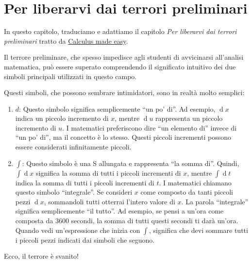 \documentclass[
  italian,
  letterpaper,
  a4paper,
  11pt,
  open=any]{scrbook}
\theoremstyle{plain}
\theoremstyle{definition}
\theoremstyle{definition}
\theoremstyle{remark}
\begin{document}
\chapter{Per liberarvi dai terrori preliminari}\label{sec-apx-calculus}

In questo capitolo, traduciamo e adattiamo il capitolo \emph{Per
liberarvi dai terrori preliminari} tratto da
\href{https://calculusmadeeasy.org/1.html}{Calculus made easy}.

\begin{tcolorbox}[enhanced jigsaw, arc=.35mm, bottomrule=.15mm, bottomtitle=1mm, breakable, colback=white, colbacktitle=quarto-callout-important-color!10!white, colframe=quarto-callout-important-color-frame, coltitle=black, left=2mm, leftrule=.75mm, opacityback=0, opacitybacktitle=0.6, rightrule=.15mm, title=\textcolor{quarto-callout-important-color}{\faExclamation}\hspace{0.5em}{Superare i terrori preliminari}, titlerule=0mm, toprule=.15mm, toptitle=1mm]

Il terrore preliminare, che spesso impedisce agli studenti di
avvicinarsi all'analisi matematica, può essere superato comprendendo il
significato intuitivo dei due simboli principali utilizzati in questo
campo.

Questi simboli, che possono sembrare intimidatori, sono in realtà molto
semplici:

\begin{enumerate}
\def\labelenumi{\arabic{enumi}.}
\item
  \textbf{\(d\)}: Questo simbolo significa semplicemente ``un po' di''.
  Ad esempio, \(\operatorname{d}\!x\) indica un piccolo incremento di
  \(x\), mentre \(\operatorname{d}\!u\) rappresenta un piccolo
  incremento di \(u\). I matematici preferiscono dire ``un elemento di''
  invece di ``un po' di'', ma il concetto è lo stesso. Questi piccoli
  incrementi possono essere considerati infinitamente piccoli.
\item
  \textbf{\(\int\)}: Questo simbolo è una S allungata e rappresenta ``la
  somma di''. Quindi, \(\int \operatorname{d}\!x\) significa la somma di
  tutti i piccoli incrementi di \(x\), mentre
  \(\int \operatorname{d}\!t\) indica la somma di tutti i piccoli
  incrementi di \(t\). I matematici chiamano questo simbolo
  ``integrale''. Se consideri \(x\) come composto da tanti piccoli pezzi
  \(\operatorname{d}\!x\), sommandoli tutti otterrai l'intero valore di
  \(x\). La parola ``integrale'' significa semplicemente ``il tutto''.
  Ad esempio, se pensi a un'ora come composta da 3600 secondi, la somma
  di tutti questi secondi ti darà un'ora. Quando vedi un'espressione che
  inizia con \(\int\), significa che devi sommare tutti i piccoli pezzi
  indicati dai simboli che seguono.
\end{enumerate}

Ecco, il terrore è svanito!

\end{tcolorbox}
\end{document}
